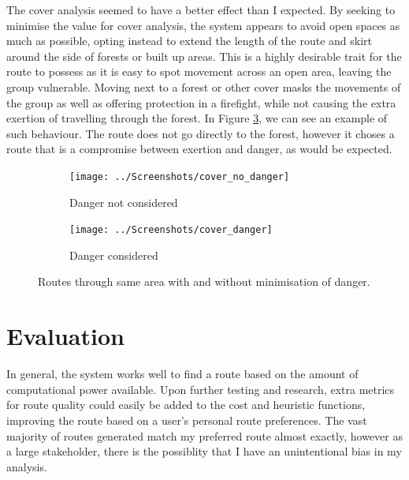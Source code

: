 \documentclass[12pt,a4paper]{article}
\begin{document}
  \par The cover analysis seemed to have a better effect than I expected. By seeking to minimise the value for cover analysis, the system appears to avoid open spaces as much as possible, opting instead to extend the length of the route and skirt around the side of forests or built up areas. This is a highly desirable trait for the route to possess as it is easy to spot movement across an open area, leaving the group vulnerable. Moving next to a forest or other cover masks the movements of the group as well as offering protection in a firefight, while not causing the extra exertion of travelling through the forest. In Figure \ref{danger_cover:danger_cover}, we can see an example of such behaviour. The route does not go directly to the forest, however it choses a route that is a compromise between exertion and danger, as would be expected.

  \begin{figure}
    \begin{subfigure}{0.5\textwidth}
      \texttt{[image: ../Screenshots/cover\_no\_danger]}
      \caption{Danger not considered}
      \label{danger_cover:no_danger}
    \end{subfigure}
    \begin{subfigure}{0.5\textwidth}
      \texttt{[image: ../Screenshots/cover\_danger]}
      \caption{Danger considered}
      \label{danger_cover:danger}
    \end{subfigure}
    \caption{Routes through same area with and without minimisation of danger.}
    \label{danger_cover:danger_cover}
  \end{figure}

  \section{Evaluation}
  \par In general, the system works well to find a route based on the amount of computational power available. Upon further testing and research, extra metrics for route quality could easily be added to the cost and heuristic functions, improving the route based on a user's personal route preferences. The vast majority of routes generated match my preferred route almost exactly, however as a large stakeholder, there is the possiblity that I have an unintentional bias in my analysis.
\end{document}

